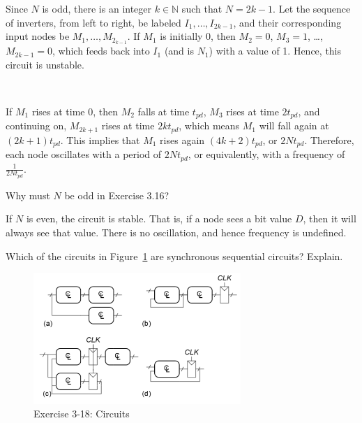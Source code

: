 \documentclass[12pt]{article}
\newenvironment{ex}[2][Exercise]{\begin{trivlist}
		\item[\hskip \labelsep {\bfseries #1}\hskip \labelsep {\bfseries #2.}]}{\end{trivlist}}
\newenvironment{sol}[1][Solution]{\begin{trivlist}
		\item[\hskip \labelsep {\bfseries #1:}]}{\end{trivlist}}
\begin{document}
\begin{sol}
	Since $N$ is odd, there is an integer $k\in\mathbb{N}$ such that $N=2k-1$. Let the sequence of inverters, from
	left to right, be labeled $I_1,\ldots, I_{2k-1}$, and their corresponding input nodes be $M_{1},\ldots, M_{2_{k-1}}$. If $M_1$ is initially 0, then $M_2=0$, $M_3=1$, \ldots, $M_{2k-1}=0$, which feeds back into
	$I_1$ (and is $N_1$) with a value of 1. Hence, this circuit is unstable. \
	
	\
	
	If $M_1$ rises at time 0, then $M_2$ falls at time $t_{pd}$, $M_3$ rises at time $2t_{pd}$, and continuing on,
	$M_{2k+1}$ rises at time $2kt_{pd}$, which means $M_1$ will fall again at $(2k+1)t_{pd}$. This implies that
	$M_1$ rises again $(4k+2)t_{pd}$, or $2Nt_{pd}$. Therefore, each node oscillates with a period of $2Nt_{pd}$, or
	equivalently, with a frequency of $\frac{1}{2Nt_{pd}}$.
\end{sol}

\begin{ex}{3.17}
	Why must $N$ be odd in Exercise 3.16?
\end{ex}

\begin{sol}
	If $N$ is even, the circuit is stable. That is, if a node sees a bit value $D$, then it will always see
	that value. There is no oscillation, and hence frequency is undefined.
\end{sol}

\begin{ex}{3.18}
	Which of the circuits in Figure~\ref{03-18-circuits} are synchronous sequential circuits? Explain.
	\begin{figure}[h]
		\centering
		\includegraphics[width=0.7\textwidth]{03-18-circuits}
		\caption{Exercise 3-18: Circuits}
		\label{03-18-circuits}
	\end{figure}
\end{ex}
\end{document}
